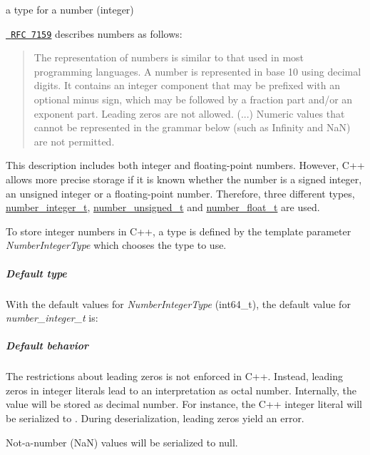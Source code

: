 a type for a number (integer) 

\href{http://rfc7159.net/rfc7159}{\texttt{ R\+FC 7159}} describes numbers as follows\+: \begin{quote}
The representation of numbers is similar to that used in most programming languages. A number is represented in base 10 using decimal digits. It contains an integer component that may be prefixed with an optional minus sign, which may be followed by a fraction part and/or an exponent part. Leading zeros are not allowed. (...) Numeric values that cannot be represented in the grammar below (such as Infinity and NaN) are not permitted. \end{quote}


This description includes both integer and floating-\/point numbers. However, C++ allows more precise storage if it is known whether the number is a signed integer, an unsigned integer or a floating-\/point number. Therefore, three different types, \mbox{\hyperlink{classnlohmann_1_1basic__json_a98e611d67b7bd75307de99c9358ab2dc}{number\+\_\+integer\+\_\+t}}, \mbox{\hyperlink{classnlohmann_1_1basic__json_ab906e29b5d83ac162e823ada2156b989}{number\+\_\+unsigned\+\_\+t}} and \mbox{\hyperlink{classnlohmann_1_1basic__json_a88d6103cb3620410b35200ee8e313d97}{number\+\_\+float\+\_\+t}} are used.

To store integer numbers in C++, a type is defined by the template parameter {\itshape Number\+Integer\+Type} which chooses the type to use.

\subparagraph*{Default type}

With the default values for {\itshape Number\+Integer\+Type} ({\ttfamily int64\+\_\+t}), the default value for {\itshape number\+\_\+integer\+\_\+t} is\+:


\begin{DoxyCode}{0}
\end{DoxyCode}


\subparagraph*{Default behavior}


\begin{DoxyItemize}
\item The restrictions about leading zeros is not enforced in C++. Instead, leading zeros in integer literals lead to an interpretation as octal number. Internally, the value will be stored as decimal number. For instance, the C++ integer literal {} will be serialized to {}. During deserialization, leading zeros yield an error.
\item Not-\/a-\/number (NaN) values will be serialized to {\ttfamily null}.
\end{DoxyItemize}

